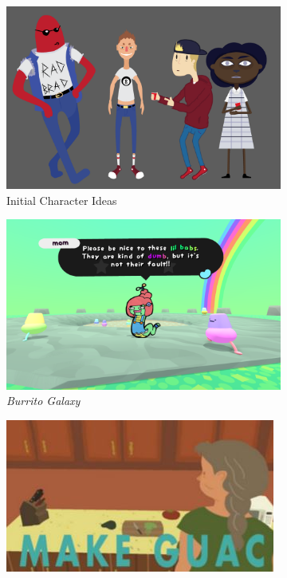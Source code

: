 \begin{figure}[H]
\begin{subfigure}{.45\textwidth}
    \includegraphics[width=.9\linewidth]{images/ref_MICHAEL04}
    \caption{Initial Character Ideas}
    \label{fig:m4}
  \end{subfigure}
  \begin{subfigure}{.5\textwidth}
    \centering
    \includegraphics[width=.9\linewidth]{images/ref_burgal}
    \caption{\textit{Burrito Galaxy}}
    \label{fig:artref3}
  \end{subfigure}
  \begin{subfigure}{.5\textwidth}
    \centering
    \includegraphics[width=.9\linewidth]{images/ref_litpar}

\end{subfigure}
\end{figure}
